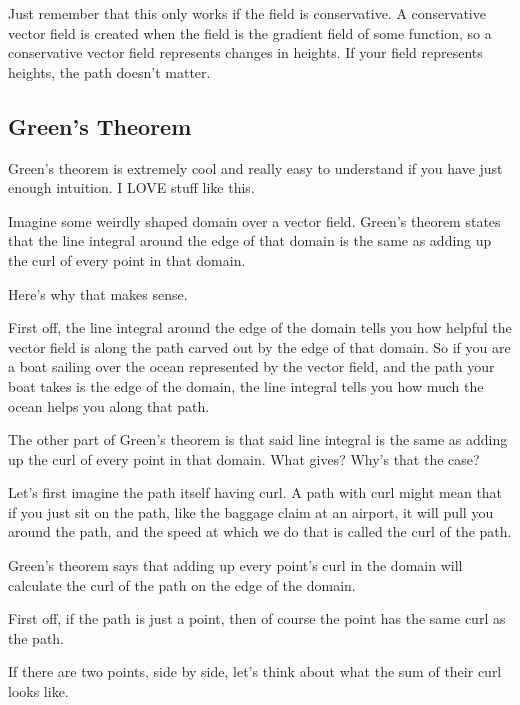 \documentclass[12pt, letterpaper]{article}
\begin{document}
Just remember that this only works if the field is conservative.
A conservative vector field is created when the field is the gradient field of some function, so a conservative vector field represents changes in heights.
If your field represents heights, the path doesn't matter.

\subsection{Green's Theorem}
Green's theorem is extremely cool and really easy to understand if you have just enough intuition.
I LOVE stuff like this.

Imagine some weirdly shaped domain over a vector field.
Green's theorem states that the line integral around the edge of that domain is the same as adding up the curl of every point in that domain.

Here's why that makes sense.

First off, the line integral around the edge of the domain tells you how helpful the vector field is along the path carved out by the edge of that domain.
So if you are a boat sailing over the ocean represented by the vector field, and the path your boat takes is the edge of the domain, the line integral tells you how much the ocean helps you along that path.

The other part of Green's theorem is that said line integral is the same as adding up the curl of every point in that domain.
What gives? Why's that the case?

Let's first imagine the path itself having curl.
A path with curl might mean that if you just sit on the path, like the baggage claim at an airport, it will pull you around the path, and the speed at which we do that is called the curl of the path.

Green's theorem says that adding up every point's curl in the domain will calculate the curl of the path on the edge of the domain.

First off, if the path is just a point, then of course the point has the same curl as the path.

If there are two points, side by side, let's think about what the sum of their curl looks like.
\end{document}
